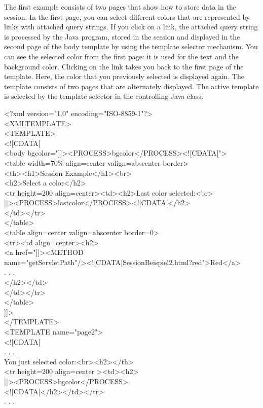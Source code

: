 The first example consists of two pages that show how to store data in
the session. In the first page, you can select different colors that
are represented by links with attached query strings. If you click on a
link, the attached query string is processed by the Java program, stored
in the session and displayed in the second page of the body template by
using the template selector mechanism. You can see the selected color
from the first page: it is used for the text and the background color.
Clicking on the link takes you back to the first page of the template.
Here, the color that you previously selected is displayed again.
The template consists of two pages that are alternately displayed. The
active template is selected by the template selector in the controlling
Java class:

\begin{java}
<?xml version="1.0" encoding="ISO-8859-1"?>\\
<XMLTEMPLATE>\\
<TEMPLATE>\\
<![CDATA[\\
<body bgcolor="]]><PROCESS>bgcolor</PROCESS><![CDATA[">\\
<table width=70\% align=center valign=abscenter border>\\
<th><h1>Session Example</h1><br>\\
<h2>Select a color</h2>\\
<tr height=200 align=center><td><h2>Last color selected:<br>\\
]]><PROCESS>lastcolor</PROCESS><![CDATA[</h2>\\
</td></tr>\\
</table>\\
<table align=center valign=abscenter border=0>\\
<tr><td align=center><h2>\\
\jtabc        <a href="]]><METHOD\\
name="getServletPath"/><![CDATA[SessionBeispiel2.html?red">Red</a>\\
. . .\\
\jtabc        </h2></td>\\
</td></tr>\\
</table>\\
]]>\\
</TEMPLATE>\\
<TEMPLATE name="page2">\\
<![CDATA[\\
\jtabb     . . .\\
You just selected color:<br><h2></th>\\
\jtabc        <tr height=200 align=center ><td><h2>\\
\jtabc        ]]><PROCESS>bgcolor</PROCESS>\\
\jtabc        <![CDATA[</h2></td></tr>\\
\jtabb     . . .\\
\end{java}

